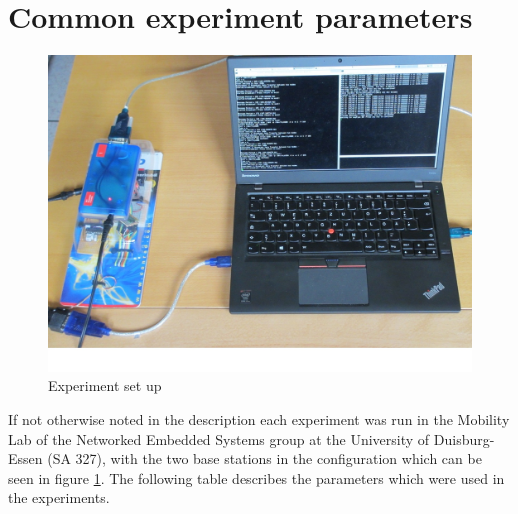 \newpage

\section{Common experiment parameters}
\label{sec:commonPara}
\begin{figure}[H]
	\centering
	\includegraphics[scale=.75]{content/images/expSetup.JPG}
	\caption{Experiment set up}\label{fig:expSetup}
\end{figure}

If not otherwise noted in the description each experiment was run in the Mobility Lab of the Networked Embedded Systems group at the University of Duisburg-Essen (SA 327), with the two base stations in the configuration which can be seen in figure \ref{fig:expSetup}. The following table describes the parameters which were used in the experiments.

